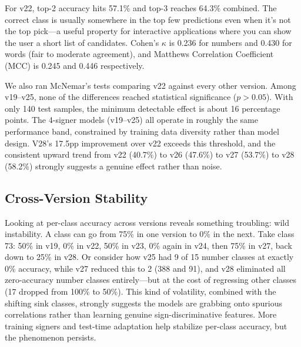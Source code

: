 \documentclass[conference]{IEEEtran}
\begin{document}
For v22, top-2 accuracy hits 57.1\% and top-3 reaches 64.3\% combined. The correct class is usually somewhere in the top few predictions even when it's not the top pick---a useful property for interactive applications where you can show the user a short list of candidates. Cohen's $\kappa$ is 0.236 for numbers and 0.430 for words (fair to moderate agreement), and Matthews Correlation Coefficient (MCC) is 0.245 and 0.446 respectively.

We also ran McNemar's tests comparing v22 against every other version. Among v19--v25, none of the differences reached statistical significance ($p > 0.05$). With only 140 test samples, the minimum detectable effect is about 16 percentage points. The 4-signer models (v19--v25) all operate in roughly the same performance band, constrained by training data diversity rather than model design. V28's 17.5pp improvement over v22 exceeds this threshold, and the consistent upward trend from v22 (40.7\%) to v26 (47.6\%) to v27 (53.7\%) to v28 (58.2\%) strongly suggests a genuine effect rather than noise.

\subsection{Cross-Version Stability}

Looking at per-class accuracy across versions reveals something troubling: wild instability. A class can go from 75\% in one version to 0\% in the next. Take class 73: 50\% in v19, 0\% in v22, 50\% in v23, 0\% again in v24, then 75\% in v27, back down to 25\% in v28. Or consider how v25 had 9 of 15 number classes at exactly 0\% accuracy, while v27 reduced this to 2 (388 and 91), and v28 eliminated all zero-accuracy number classes entirely---but at the cost of regressing other classes (17 dropped from 100\% to 50\%). This kind of volatility, combined with the shifting sink classes, strongly suggests the models are grabbing onto spurious correlations rather than learning genuine sign-discriminative features. More training signers and test-time adaptation help stabilize per-class accuracy, but the phenomenon persists.
\end{document}
